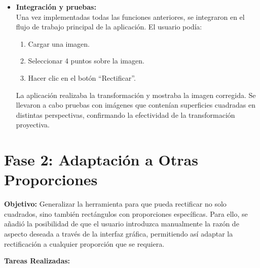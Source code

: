 \begin{itemize}
    \item \textbf{Integración y pruebas:} \\
    Una vez implementadas todas las funciones anteriores, se integraron en el flujo de trabajo principal de la aplicación. El usuario podía:
    \begin{enumerate}
        \item Cargar una imagen.
        \item Seleccionar 4 puntos sobre la imagen.
        \item Hacer clic en el botón “Rectificar”.
    \end{enumerate}
    La aplicación realizaba la transformación y mostraba la imagen corregida. Se llevaron a cabo pruebas con imágenes que contenían superficies cuadradas en distintas perspectivas, confirmando la efectividad de la transformación proyectiva.
\end{itemize}

\section{Fase 2: Adaptación a Otras Proporciones}

\textbf{Objetivo:} Generalizar la herramienta para que pueda rectificar no solo cuadrados, sino también rectángulos con proporciones específicas. Para ello, se añadió la posibilidad de que el usuario introduzca manualmente la razón de aspecto deseada a través de la interfaz gráfica, permitiendo así adaptar la rectificación a cualquier proporción que se requiera.

\vspace{\baselineskip}

\textbf{Tareas Realizadas:}


